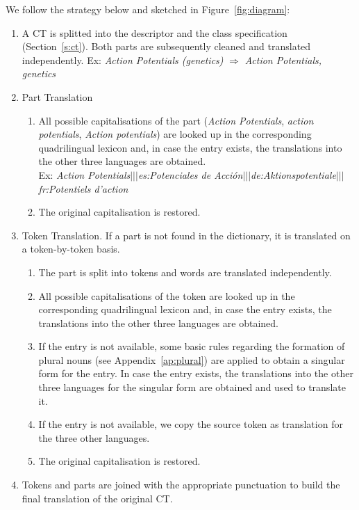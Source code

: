 \documentclass[a4paper,11pt]{article}
\begin{document}
	\bigskip
	\noindent
	We follow the strategy below and sketched in Figure~\ref{fig:diagram}:
	\begin{enumerate}
		\item A CT is splitted into the descriptor and the class specification (Section~\ref{s:ct}). Both parts are subsequently cleaned and translated independently. 
		Ex: \emph{Action Potentials (genetics)} $\Rightarrow$ \emph{Action Potentials, genetics}
		\item Part Translation
		\begin{enumerate}[label*=\arabic*.]
			\item  All possible capitalisations of the part (\emph{Action Potentials}, \emph{action potentials}, \emph{Action potentials}) are looked up in the corresponding quadrilingual lexicon and, in case the entry exists, the translations into the other three languages are obtained. \\ 
			Ex: \emph{Action Potentials$|||$es:Potenciales de Acción$|||$de:Aktionspotentiale$|||$fr:Potentiels d'action}
			\item The original capitalisation is restored.
		\end{enumerate}
		
		\item Token Translation. If a part is not found in the dictionary, it is translated on a token-by-token basis.
		\begin{enumerate}[label*=\arabic*.]
			\item The part is split into tokens and words are translated independently.  
			\item  All possible capitalisations of the token are looked up in the corresponding quadrilingual lexicon and, in case the entry exists, the translations into the other three languages are obtained.
			\item If the entry is not available, some basic rules regarding the formation of plural nouns (see Appendix~\ref{ap:plural}) are applied to obtain a singular form for the entry. In case the entry exists, the translations into the other three languages for the singular form are obtained and used to translate it.
			\item If the entry is not available, we copy the source token as translation for the three other languages.
			\item The original capitalisation is restored.
		\end{enumerate}
		
		\item Tokens and parts are joined with the appropriate punctuation to build the final translation of the original CT.
		
	\end{enumerate}
	
\end{document}
